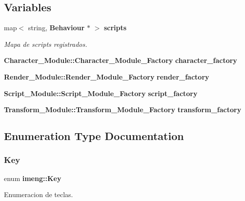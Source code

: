 \subsection*{Variables}
\begin{DoxyCompactItemize}
\item 
map$<$ string, \textbf{ Behaviour} $\ast$ $>$ \textbf{ scripts}
\begin{DoxyCompactList}\small\item\em Mapa de scripts registrados. \end{DoxyCompactList}\item 
\textbf{ Character\+\_\+\+Module\+::\+Character\+\_\+\+Module\+\_\+\+Factory} \textbf{ character\+\_\+factory}
\item 
\textbf{ Render\+\_\+\+Module\+::\+Render\+\_\+\+Module\+\_\+\+Factory} \textbf{ render\+\_\+factory}
\item 
\textbf{ Script\+\_\+\+Module\+::\+Script\+\_\+\+Module\+\_\+\+Factory} \textbf{ script\+\_\+factory}
\item 
\textbf{ Transform\+\_\+\+Module\+::\+Transform\+\_\+\+Module\+\_\+\+Factory} \textbf{ transform\+\_\+factory}
\end{DoxyCompactItemize}


\subsection{Enumeration Type Documentation}
\mbox{\label{namespaceimeng_a60e50ccf20319e9e9098a7e652fe9f91}} 
\subsubsection{Key}
{\footnotesize\ttfamily enum \textbf{ imeng\+::\+Key}}



Enumeracion de teclas. 

